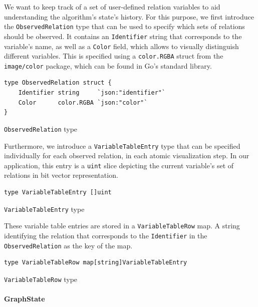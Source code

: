 We want to keep track of a set of user-defined relation variables to aid understanding the algorithm's state's history. For this purpose, we first introduce the \texttt{ObservedRelation} type that can be used to specify which sets of relations should be observed. It contains an \texttt{Identifier} string that corresponds to the variable's name, as well as a \texttt{Color} field, which allows to visually distinguish different variables. This is specified using a \texttt{color.RGBA} struct from the \texttt{image/color} package, which can be found in Go's standard library.

\begin{code}
\begin{verbatim}
type ObservedRelation struct {
    Identifier string     `json:"identifier"`
    Color      color.RGBA `json:"color"`
}
\end{verbatim}
\caption{\texttt{ObservedRelation} type}
\end{code}
\vspace{0.8cm}

Furthermore, we introduce a \texttt{VariableTableEntry} type that can be specified individually for each observed relation, in each atomic visualization step. In our application, this entry is a \texttt{uint} slice depicting the current variable's set of relations in bit vector representation.

\begin{code}
\begin{verbatim}
type VariableTableEntry []uint
\end{verbatim}
\caption{\texttt{VariableTableEntry} type}
\end{code}
\vspace{0.8cm}

These variable table entries are stored in a \texttt{VariableTableRow} map. A string identifying the relation that corresponds to the \texttt{Identifier} in the \texttt{ObservedRelation} as the key of the map.

\begin{code}
\begin{verbatim}
type VariableTableRow map[string]VariableTableEntry
\end{verbatim}
\caption{\texttt{VariableTableRow} type}
\end{code}
\vspace{0.8cm}

\paragraph{GraphState}

